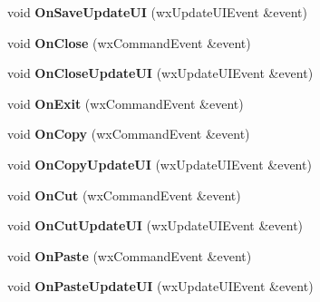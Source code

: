 \begin{DoxyCompactItemize}
\item 
\hypertarget{classfdmdv2_top_frame_aac7ce1795fff90a80da7c6b3a3fe6770}{void {\bfseries On\-Save\-Update\-U\-I} (wx\-Update\-U\-I\-Event \&event)}\label{classfdmdv2_top_frame_aac7ce1795fff90a80da7c6b3a3fe6770}

\item 
\hypertarget{classfdmdv2_top_frame_a83f38a1a80648104e706813518c4e88e}{void {\bfseries On\-Close} (wx\-Command\-Event \&event)}\label{classfdmdv2_top_frame_a83f38a1a80648104e706813518c4e88e}

\item 
\hypertarget{classfdmdv2_top_frame_a769791d057058f47056dc712f5676779}{void {\bfseries On\-Close\-Update\-U\-I} (wx\-Update\-U\-I\-Event \&event)}\label{classfdmdv2_top_frame_a769791d057058f47056dc712f5676779}

\item 
\hypertarget{classfdmdv2_top_frame_a1a57ce539310fc9297dfad3de00d3eff}{void {\bfseries On\-Exit} (wx\-Command\-Event \&event)}\label{classfdmdv2_top_frame_a1a57ce539310fc9297dfad3de00d3eff}

\item 
\hypertarget{classfdmdv2_top_frame_a20d13ff92c314580a172be4fa637780f}{void {\bfseries On\-Copy} (wx\-Command\-Event \&event)}\label{classfdmdv2_top_frame_a20d13ff92c314580a172be4fa637780f}

\item 
\hypertarget{classfdmdv2_top_frame_a85a5f9f93ed7f201293d380b102cc3fa}{void {\bfseries On\-Copy\-Update\-U\-I} (wx\-Update\-U\-I\-Event \&event)}\label{classfdmdv2_top_frame_a85a5f9f93ed7f201293d380b102cc3fa}

\item 
\hypertarget{classfdmdv2_top_frame_a343d064f0407d4d3345133d46571e4cf}{void {\bfseries On\-Cut} (wx\-Command\-Event \&event)}\label{classfdmdv2_top_frame_a343d064f0407d4d3345133d46571e4cf}

\item 
\hypertarget{classfdmdv2_top_frame_a81ba22ffbddc7469e31181974007c5ed}{void {\bfseries On\-Cut\-Update\-U\-I} (wx\-Update\-U\-I\-Event \&event)}\label{classfdmdv2_top_frame_a81ba22ffbddc7469e31181974007c5ed}

\item 
\hypertarget{classfdmdv2_top_frame_a195ddcfc4b57aa6b274eb40d9cf2c8ac}{void {\bfseries On\-Paste} (wx\-Command\-Event \&event)}\label{classfdmdv2_top_frame_a195ddcfc4b57aa6b274eb40d9cf2c8ac}

\item 
\hypertarget{classfdmdv2_top_frame_abb18285166128574f831ccca7144ef0c}{void {\bfseries On\-Paste\-Update\-U\-I} (wx\-Update\-U\-I\-Event \&event)}\label{classfdmdv2_top_frame_abb18285166128574f831ccca7144ef0c}


\end{DoxyCompactItemize}
